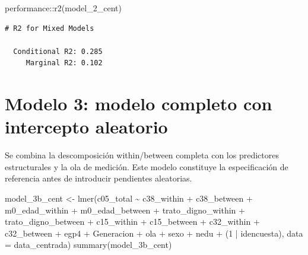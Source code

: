 \documentclass[
  spanish,
  a4paper,
  oneside]{scrbook}
\newenvironment{Shaded}{\begin{snugshade}}{\end{snugshade}}
\newcommand{\AttributeTok}[1]{\textcolor[rgb]{0.40,0.45,0.13}{#1}}
\newcommand{\DecValTok}[1]{\textcolor[rgb]{0.68,0.00,0.00}{#1}}
\newcommand{\FunctionTok}[1]{\textcolor[rgb]{0.28,0.35,0.67}{#1}}
\newcommand{\NormalTok}[1]{\textcolor[rgb]{0.00,0.23,0.31}{#1}}
\newcommand{\OtherTok}[1]{\textcolor[rgb]{0.00,0.23,0.31}{#1}}
\newcommand{\SpecialCharTok}[1]{\textcolor[rgb]{0.37,0.37,0.37}{#1}}
\begin{document}
\begin{Shaded}
\begin{Highlighting}[]
\NormalTok{performance}\SpecialCharTok{::}\FunctionTok{r2}\NormalTok{(model\_2\_cent)}
\end{Highlighting}
\end{Shaded}

\begin{verbatim}
# R2 for Mixed Models

  Conditional R2: 0.285
     Marginal R2: 0.102
\end{verbatim}

\section{Modelo 3: modelo completo con intercepto
aleatorio}\label{modelo-3-modelo-completo-con-intercepto-aleatorio}

Se combina la descomposición within/between completa con los predictores
estructurales y la ola de medición. Este modelo constituye la
especificación de referencia antes de introducir pendientes aleatorias.

\begin{Shaded}
\begin{Highlighting}[]
\NormalTok{model\_3b\_cent }\OtherTok{\textless{}{-}} \FunctionTok{lmer}\NormalTok{(c05\_total }\SpecialCharTok{\textasciitilde{}} 
\NormalTok{                        c38\_within }\SpecialCharTok{+}\NormalTok{ c38\_between }\SpecialCharTok{+}
\NormalTok{                        m0\_edad\_within }\SpecialCharTok{+}\NormalTok{ m0\_edad\_between }\SpecialCharTok{+}
\NormalTok{                        trato\_digno\_within }\SpecialCharTok{+}\NormalTok{ trato\_digno\_between }\SpecialCharTok{+}
\NormalTok{                        c15\_within }\SpecialCharTok{+}\NormalTok{ c15\_between }\SpecialCharTok{+}
\NormalTok{                        c32\_within }\SpecialCharTok{+}\NormalTok{ c32\_between }\SpecialCharTok{+}
\NormalTok{                        egp4 }\SpecialCharTok{+}\NormalTok{ Generacion }\SpecialCharTok{+}\NormalTok{ ola }\SpecialCharTok{+}\NormalTok{ sexo }\SpecialCharTok{+}\NormalTok{ nedu }\SpecialCharTok{+}
\NormalTok{                        (}\DecValTok{1} \SpecialCharTok{|}\NormalTok{ idencuesta), }\AttributeTok{data =}\NormalTok{ data\_centrada)}
\FunctionTok{summary}\NormalTok{(model\_3b\_cent)}
\end{Highlighting}
\end{Shaded}
\end{document}
